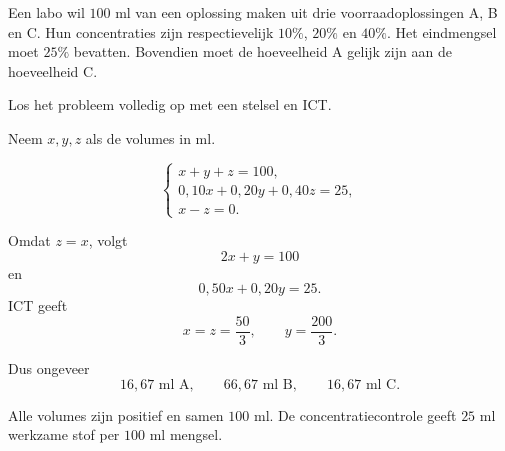 \documentclass{ximera}
\begin{document}


\begin{oefening}{\oefU\ESS}

Een labo wil \(100\) ml van een oplossing maken uit drie voorraadoplossingen
A, B en C. Hun concentraties zijn respectievelijk \(10\%\), \(20\%\) en
\(40\%\). Het eindmengsel moet \(25\%\) bevatten. Bovendien moet de
hoeveelheid A gelijk zijn aan de hoeveelheid C.

Los het probleem volledig op met een stelsel en ICT.

\begin{oplossing}
Neem \(x,y,z\) als de volumes in ml.

\[
\begin{cases}
x+y+z=100,\\
0{,}10x+0{,}20y+0{,}40z=25,\\
x-z=0.
\end{cases}
\]

Omdat \(z=x\), volgt
\[
2x+y=100
\]
en
\[
0{,}50x+0{,}20y=25.
\]
ICT geeft
\[
x=z=\frac{50}{3},\qquad y=\frac{200}{3}.
\]

Dus ongeveer
\[
16{,}67\text{ ml A},\qquad
66{,}67\text{ ml B},\qquad
16{,}67\text{ ml C}.
\]

Alle volumes zijn positief en samen \(100\) ml. De concentratiecontrole
geeft \(25\) ml werkzame stof per \(100\) ml mengsel.
\end{oplossing}
\end{oefening}
\end{document}
